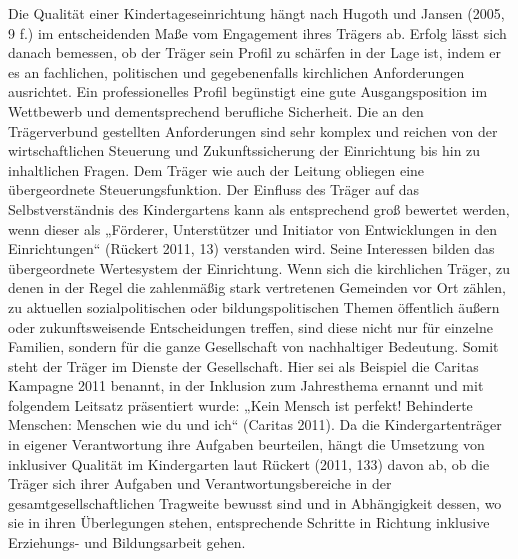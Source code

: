 Die Qualität einer Kindertageseinrichtung hängt nach Hugoth und Jansen (2005, 9 f.) im entscheidenden Maße vom Engagement ihres Trägers ab. Erfolg lässt sich danach bemessen, ob der Träger sein Profil zu schärfen in der Lage ist, indem er es an fachlichen, politischen und gegebenenfalls kirchlichen Anforderungen ausrichtet. Ein professionelles Profil begünstigt eine gute Ausgangsposition im Wettbewerb und dementsprechend berufliche Sicherheit. Die an den Trägerverbund gestellten Anforderungen sind sehr komplex und reichen von der wirtschaftlichen Steuerung und Zukunftssicherung der Einrichtung bis hin zu inhaltlichen Fragen. Dem Träger wie auch der Leitung obliegen eine übergeordnete Steuerungsfunktion. Der Einfluss des Träger auf das Selbstverständnis des Kindergartens kann als entsprechend groß bewertet werden, wenn dieser als „Förderer, Unterstützer und Initiator von Entwicklungen in den Einrichtungen“ (Rückert 2011, 13) verstanden wird. Seine Interessen bilden das übergeordnete Wertesystem der Einrichtung. Wenn sich die kirchlichen Träger, zu denen in der Regel die zahlenmäßig stark vertretenen Gemeinden vor Ort zählen, zu aktuellen sozialpolitischen oder bildungspolitischen Themen öffentlich äußern oder zukunftsweisende Entscheidungen treffen, sind diese nicht nur für einzelne Familien, sondern für die ganze Gesellschaft von nachhaltiger Bedeutung. Somit steht der Träger im Dienste der Gesellschaft. Hier sei als Beispiel die Caritas Kampagne 2011 benannt, in der Inklusion zum Jahresthema ernannt und mit folgendem Leitsatz präsentiert wurde: „Kein Mensch ist perfekt! Behinderte Menschen: Menschen wie du und ich“ (Caritas 2011). Da die Kindergartenträger in eigener Verantwortung ihre Aufgaben beurteilen, hängt die Umsetzung von inklusiver Qualität im Kindergarten laut Rückert (2011, 133) davon ab,  ob die Träger sich ihrer Aufgaben und Verantwortungsbereiche in der gesamtgesellschaftlichen Tragweite bewusst sind und in Abhängigkeit dessen, wo sie in ihren Überlegungen stehen, entsprechende Schritte in Richtung inklusive Erziehungs- und Bildungsarbeit gehen.  
   
